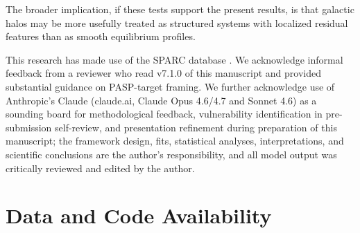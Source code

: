 \documentclass[linenumbers]{aastex701}
\begin{document}
The broader implication, if these tests support the present results, is that galactic halos may be more usefully treated as structured systems with localized residual features than as smooth equilibrium profiles.


\begin{acknowledgments}
This research has made use of the SPARC database \citep{Lelli2016}. We acknowledge informal feedback from a reviewer who read v7.1.0 of this manuscript and provided substantial guidance on PASP-target framing. We further acknowledge use of Anthropic's Claude (claude.ai, Claude Opus 4.6/4.7 and Sonnet 4.6) as a sounding board for methodological feedback, vulnerability identification in pre-submission self-review, and presentation refinement during preparation of this manuscript; the framework design, fits, statistical analyses, interpretations, and scientific conclusions are the author's responsibility, and all model output was critically reviewed and edited by the author.
\end{acknowledgments}



\section*{Data and Code Availability}\label{sec:dataavail}
\end{document}

